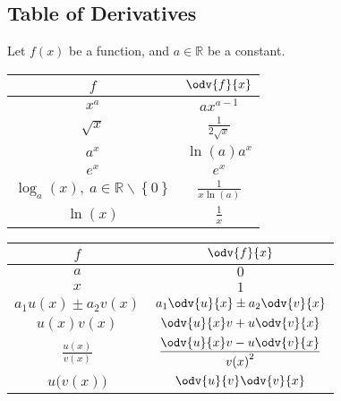 \documentclass{article}
\begin{document}
\subsection{Table of Derivatives}
Let \(f(x)\) be a function, and \(a\in\mathbb{R}\) be a constant.
\begin{table}[H]
    \renewcommand*{\arraystretch}{1.5}
    \centering
    \begin{tabular}{c c}
        \toprule
        \(f\)                                                                      & \(\odv{f}{x}\)                                    \\
        \midrule
        \(x^a\)                                                                    & \(a x^{a-1}\)                                    \\
        \(\sqrt{x}\)                                                               & \(\displaystyle \frac{1}{2\sqrt{x}}\)            \\
        \(a^x\)                                                                    & \(\ln{\left(a\right)} a^x\)                      \\
        \(e^x\)                                                                   & \(e^x\)                                         \\
        \(\log_a{\left(x\right)}, \: a\in \mathbb{R}\backslash\left\{ 0 \right\}\) & \(\displaystyle \frac{1}{x\ln{\left(a\right)}}\) \\[8pt]
        \(\ln{\left(x\right)}\)                                                    & \(\displaystyle \frac{1}{x}\)                    \\[5pt]
        \bottomrule
    \end{tabular}
    \begin{tabular}{c c}
        \toprule
        \(f\)                               & \(\odv{f}{x}\)                                              \\
        \midrule
        \(a\)                               & \(0\)                                                      \\
        \(x\)                               & \(1\)                                                      \\
        \(a_1 u(x) \pm a_2 v(x)\)           & \(\displaystyle a_1\odv{u}{x} \pm a_2\odv{v}{x}\)            \\[8pt]
        \(u(x)v(x)\)                        & \(\displaystyle \odv{u}{x}v + u\odv{v}{x}\)                  \\[10pt]
        \(\displaystyle \frac{u(x)}{v(x)}\) & \(\displaystyle \frac{\odv{u}{x}v - u\odv{v}{x}}{{v(x)}^2}\) \\[8pt]
        \(u\bigl(v\left(x \right) \bigr)\)  & \(\displaystyle \odv{u}{v}\odv{v}{x}\)                       \\[5pt]
        \bottomrule
    \end{tabular}
\end{table}
\end{document}
